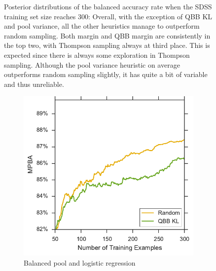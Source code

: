 \begin{figure}[p]
\begin{subfigure}{\textwidth}
	\end{subfigure}
	\caption[Violin plots of balanced accuracy rate (SDSS)]{
		Posterior distributions of the balanced accuracy rate when the SDSS training set size reaches 300: Overall, with the exception of QBB KL and pool variance, all the other
		heuristics manage to outperform random sampling. Both margin and QBB margin are consistently in the top two, with Thompson sampling always at third place. This is expected
		since there is always some exploration in Thompson sampling. Although the pool
		variance heuristic on average outperforms random sampling slightly, it has quite a
		bit of variable and thus unreliable.}
	\label{fig:sdss_bl_ind}
\end{figure}


\begin{figure}[p]
	\centering
	\begin{subfigure}{.5\textwidth}
		\centering
		\includegraphics[width=\textwidth]{figures/5_active/sdss_bl_ind_lower}
		\caption{Balanced pool and logistic regression}
		\label{fig:sdss_bl_ind_lower}
	\end{subfigure}%
	\begin{subfigure}{.5\textwidth}
		\centering

\end{subfigure}
\end{figure}
